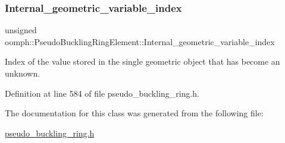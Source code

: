 \subsubsection{\texorpdfstring{Internal\+\_\+geometric\+\_\+variable\+\_\+index}{Internal\_geometric\_variable\_index}}
{\footnotesize\ttfamily unsigned oomph\+::\+Pseudo\+Buckling\+Ring\+Element\+::\+Internal\+\_\+geometric\+\_\+variable\+\_\+index\hspace{0.3cm}{\ttfamily [private]}}



Index of the value stored in the single geometric object that has become an unknown. 



Definition at line 584 of file pseudo\+\_\+buckling\+\_\+ring.\+h.



The documentation for this class was generated from the following file\+:\begin{DoxyCompactItemize}
\item 
\hyperlink{pseudo__buckling__ring_8h}{pseudo\+\_\+buckling\+\_\+ring.\+h}\end{DoxyCompactItemize}
